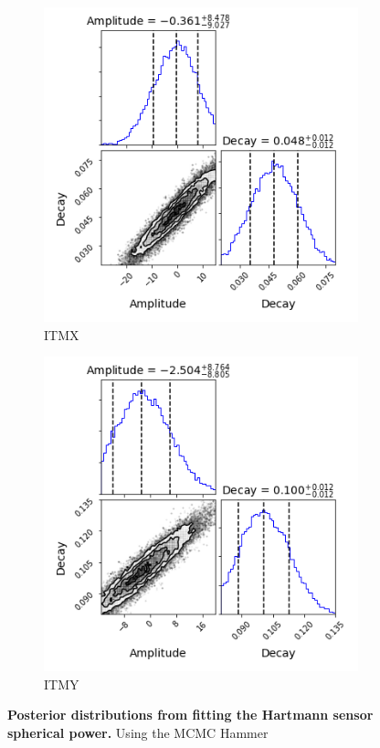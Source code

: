	\begin{figure}[!]
		\centering
		\begin{subfigure}[b]{0.5\textwidth}
			\includegraphics[width=\linewidth]{../Figures/MCMC_ITMX_abs.png}
			\caption{ITMX}
			\label{fig:mcmc_itmx_abs}
		\end{subfigure}%
		\begin{subfigure}[b]{0.5\textwidth}
			\includegraphics[width=\linewidth]{../Figures/MCMC_ITMY_abs.png}
			\caption{ITMY}
			\label{fig:mcmc_itmy_abs}
		\end{subfigure}
		\caption[Posterior distributions from fitting the Hartmann sensor spherical power.]  
		{\textbf{Posterior distributions from fitting the Hartmann sensor spherical power.}  
			Using the MCMC Hammer \cite{MCMC_Hammer}}
		\label{fig:mcmc_hws_abs}
	\end{figure}
	
